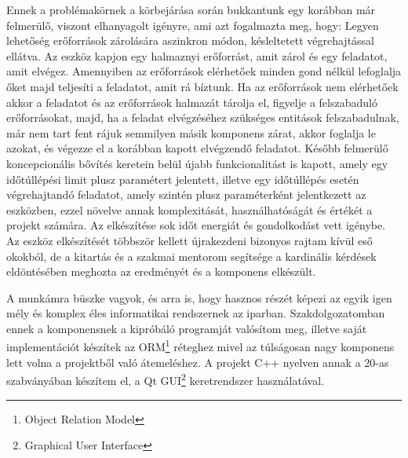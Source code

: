 Ennek a problémakörnek a körbejárása során bukkantunk egy korábban már felmerülő, viszont elhanyagolt igényre, ami azt fogalmazta meg, hogy: Legyen lehetőség erőforrások zárolására aszinkron módon, késleltetett végrehajtással ellátva. Az eszköz kapjon egy halmaznyi erőforrást, amit zárol és egy feladatot, amit elvégez. Amennyiben az erőforrások elérhetőek minden gond nélkül lefoglalja őket majd teljesíti a feladatot, amit rá bíztunk. Ha az erőforrások nem elérhetőek akkor a feladatot és az erőforrások halmazát tárolja el, figyelje a felszabaduló erőforrásokat, majd, ha a feladat elvégzéséhez szükséges entitások felszabadulnak, már nem tart fent rájuk semmilyen másik komponens zárat, akkor foglalja le azokat, és végezze el a korábban kapott elvégzendő feladatot. Később felmerülő koncepcionális bővítés keretein belül újabb funkcionalitást is kapott, amely egy időtúllépési limit plusz paramétert jelentett, illetve egy időtúllépés esetén végrehajtandó feladatot, amely szintén plusz paraméterként jelentkezett az eszközben, ezzel növelve annak komplexitását, használhatóságát és értékét a projekt számára. Az elkészítése sok időt energiát és gondolkodást vett igénybe. Az eszköz elkészítését többször kellett újrakezdeni bizonyos rajtam kívül eső okokból, de a kitartás és a szakmai mentorom segítsége a kardinális kérdések eldöntésében meghozta az eredményét és a komponens elkészült.

A munkámra büszke vagyok, és arra is, hogy hasznos részét képezi az egyik igen mély és komplex éles informatikai rendszernek az iparban. Szakdolgozatomban ennek a komponensnek a kipróbáló programját valósítom meg, illetve saját implementációt készítek az ORM\footnote {Object Relation Model} réteghez mivel az túlságosan nagy komponens lett volna a projektből való átemeléshez. A projekt C++ nyelven annak a 20-as szabványában készítem el, a Qt\cite{qt_docs} GUI\footnote {Graphical User Interface} keretrendszer használatával.